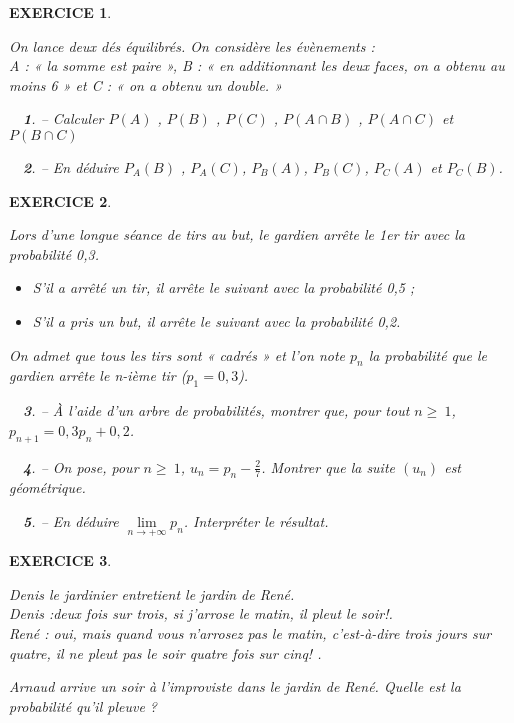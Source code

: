 \documentclass[a4paper]{article}   %
\renewcommand{\(}{\left(}
\renewcommand{\)}{\right)}
\newtheorem{ques}{~}
\newenvironment{qu}{\begin{ques}--} {\end{ques}}
\newtheorem{EXO}{\large EXERCICE }
\newenvironment{EX}   { \setcounter{ques}{0} \begin{EXO} \hrulefill ~\vspace{0.3cm}

\normalfont}    {\end{EXO} \medskip}
\newcommand{\se}{\geqslant~} 		%
\begin{document}
\begin{EX}
On lance deux dés équilibrés. On considère les évènements : \\ A : « la somme est paire »,
B : « en additionnant les deux faces, on a obtenu au moins 6 » et C : « on a obtenu un double. »
\begin{qu} Calculer $P(A)$ , $P(B)$ , $P(C)$ , $P(A\cap B)$ , $P(A\cap C)$ et $P(B\cap C)$
\end{qu}
\begin{qu} En déduire $P_A( B)$ , $P_A(C )$, $P_B(A )$, $P_B(C )$, $P_C(A )$ et $P_C(B )$.
\end{qu}
\end{EX}
\begin{EX}
Lors d’une longue séance de tirs au but, le gardien arrête le 1er tir avec la probabilité 0,3.
\begin{itemize}
\item S’il a arrêté un tir, il arrête le suivant avec la probabilité 0,5 ;
\item S’il a pris un but, il arrête le suivant avec la probabilité 0,2.
\end{itemize}
On admet que tous les tirs sont « cadrés » et l’on note $p_n$ la probabilité que le gardien arrête le n-ième tir ($p_1= 0,3$).

\begin{qu} \`A l’aide d’un arbre de probabilités, montrer que, pour tout $n \se1$, $p_{n+1}=0,3p_n+0,2$.
\end{qu}
\begin{qu} On pose, pour $n\se1$, $u_n=p_n-\displaystyle \frac{2}{7}$. Montrer que la suite $(u_n)$ est géométrique.
\end{qu}
\begin{qu} En déduire $\lim\limits_{n \to +\infty} p_n$. Interpréter le résultat.
\end{qu}
\end{EX}
\begin{EX}
Denis le jardinier entretient le jardin de René. \\
Denis :\og deux fois sur trois, si j'arrose le matin, il pleut le soir!\fg.\\
René : \og oui, mais quand vous n'arrosez pas le matin, c'est-à-dire trois jours sur quatre, il ne pleut pas le soir quatre fois sur cinq! \fg.

Arnaud arrive un soir à l'improviste dans le jardin de René. Quelle est la probabilité qu'il pleuve ?

\end{EX}
\end{document}
